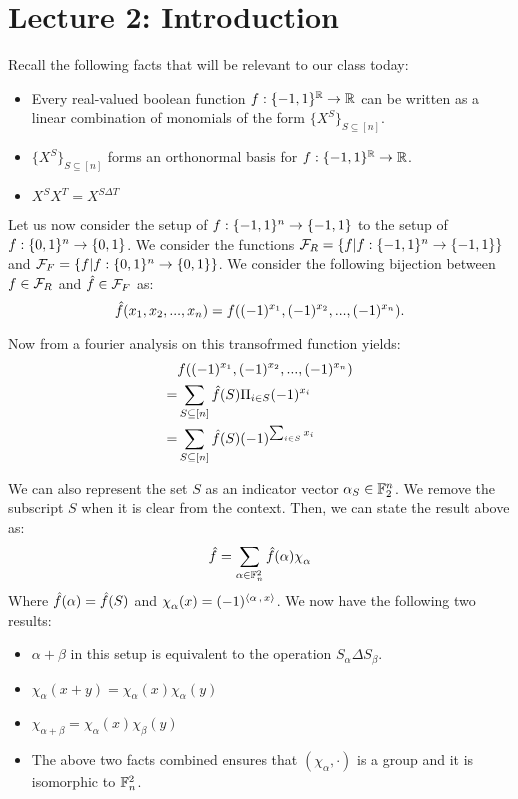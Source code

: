 \chapter{Lecture 2: Introduction}

Recall the following facts that will be relevant to our class today:

\begin{itemize}
    \item Every real-valued boolean function ${f} : {\{-1,1\}^{\mathbb{R}}} \rightarrow {\mathbb{R}}$ can be written as a linear combination of monomials of the form $\{X^S\}_{S\subseteq [n]}$.
    \item $\{X^S\}_{S\subseteq [n]}$ forms an orthonormal basis for ${f} : {\{-1,1\}^{\mathbb{R}}} \rightarrow {\mathbb{R}}$.
    \item $X^SX^T = X^{S\Delta T}$
\end{itemize}

Let us now consider the setup of ${f} : {\{-1,1\}^n} \rightarrow {\{-1,1\}}$ to the setup of ${f} : {\{0,1\}^n} \rightarrow {\{0,1\}}$. We consider the functions $\mathcal{F}_R =\{f|{f} : {\{-1,1\}^n} \rightarrow {\{-1,1\}}\}$ and $\mathcal{F}_F = \{f|{f} : {\{0,1\}^n} \rightarrow {\{0,1\}}\}$. We consider the following bijection between $f\in\mathcal{F}_R$ and $\hat{f} \in \mathcal{F}_F$ as:
\[
\hat{f}(x_1,x_2,...,x_n) = f((-1)^{x_1},(-1)^{x_2},...,(-1)^{x_n}). 
\]

Now from a fourier analysis on this transofrmed function yields:
\begin{align*}
    &f((-1)^{x_1},(-1)^{x_2},...,(-1)^{x_n})\\
    =&\sum_{S \subseteq [n]} \hat{f}(S)\Pi_{i\in S}(-1)^{x_i}\\
    =&\sum_{S \subseteq [n]} \hat{f}(S) (-1)^{\sum_{i \in S} x_i}
\end{align*}

We can also represent the set $S$ as an indicator vector $\alpha_S \in \mathbb{F}_2^n$. We remove the subscript $S$ when it is clear from the context. Then, we can state the result above as:
\[
\fhat = \sum_{\alpha \in \F_n^2} \fhat(\alpha)\chi_\alpha 
\]
Where $\hat{f}(\alpha) = \hat{f}(S)$ and $\chi_\alpha(x) = (-1)^{\inn{\alpha}{x}}$. We now have the following two results:
\begin{itemize}
    \item $\alpha + \beta$ in this setup is equivalent to the operation $S_\alpha \Delta S_\beta$.
    \item $\chi_\alpha(x+y) = \chi_\alpha(x)\chi_\alpha(y)$
    \item $\chi_{\alpha+\beta} = \chi_\alpha(x)\chi_\beta(y)$
    \item The above two facts combined ensures that $(\chi_\alpha,\cdot)$ is a group and it is isomorphic to $\mathbb{F}_n^2$. 
\end{itemize}

